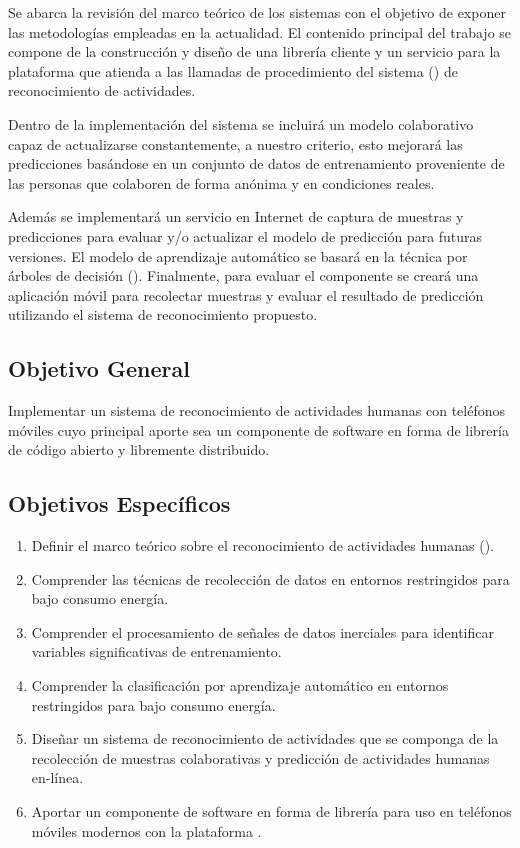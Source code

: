 Se abarca la revisión del marco teórico de los sistemas 
con el objetivo de exponer las metodologías empleadas en la actualidad.
El contenido principal del trabajo se compone de la construcción y
diseño de una librería cliente y un servicio para la plataforma \emph{}
que atienda a las llamadas de procedimiento del sistema ()
de reconocimiento de actividades. 

Dentro de la implementación del sistema  se incluirá un
modelo colaborativo capaz de actualizarse constantemente, a nuestro
criterio, esto mejorará las predicciones basándose en un conjunto
de datos de entrenamiento proveniente de las personas que colaboren
de forma anónima y en condiciones reales.

Además se implementará un servicio en Internet de captura de muestras
y predicciones para evaluar y/o actualizar el modelo de predicción
para futuras versiones. El modelo de aprendizaje automático se basará
en la técnica por árboles de decisión (). Finalmente, para
evaluar el componente se creará una aplicación móvil para recolectar
muestras y evaluar el resultado de predicción utilizando el sistema
de reconocimiento propuesto.

\subsection{Objetivo General}

\label{sec13:objetivo-general}Implementar un sistema de reconocimiento
de actividades humanas con teléfonos móviles cuyo principal aporte
sea un componente de software en forma de librería de código abierto
y libremente distribuido.

\subsection{Objetivos Específicos}

\label{sec13:objetivos-especuxedficos}
\begin{enumerate}
\item \label{enu:obe1}Definir el marco teórico sobre el reconocimiento
de actividades humanas (). 
\item \label{enu:obe2}Comprender las técnicas de recolección de datos en
entornos restringidos para bajo consumo energía. 
\item \label{enu:obe3}Comprender el procesamiento de señales de datos inerciales
para identificar variables significativas de entrenamiento. 
\item \label{enu:obe4}Comprender la clasificación por aprendizaje automático
en entornos restringidos para bajo consumo energía. 
\item \label{enu:obe5}Diseñar un sistema de reconocimiento de actividades
que se componga de la recolección de muestras colaborativas y predicción
de actividades humanas en-línea. 
\item \label{enu:obe6}Aportar un componente de software en forma de librería
para uso en teléfonos móviles modernos con la plataforma . 
\end{enumerate}

